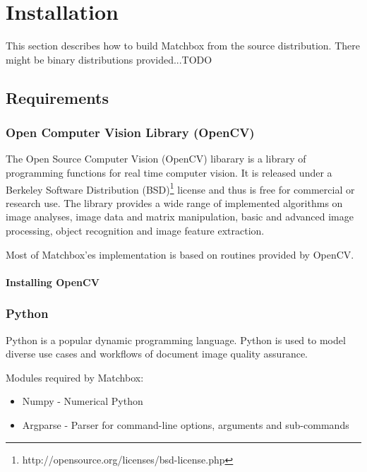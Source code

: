 \section{Installation}

This section describes how to build Matchbox from the source distribution. There might be binary distributions provided...TODO


\subsection{Requirements}

\subsubsection{Open Computer Vision Library (OpenCV)}

The Open Source Computer Vision (OpenCV) libarary \cite{opencv_library} is a library of programming functions for real time computer vision.
It is released under a Berkeley Software Distribution (BSD)\footnote{http://opensource.org/licenses/bsd-license.php} license and thus is free for commercial or research use.
The library provides a wide range of implemented algorithms on image analyses, image data and matrix manipulation, basic and advanced image processing, object recognition and image feature extraction.

Most of Matchbox'es implementation is based on routines provided by OpenCV. 

\paragraph{Installing OpenCV}


\subsubsection{Python}

Python is a popular dynamic programming language. 
Python is used to model diverse use cases and workflows of document image quality assurance.

Modules required by Matchbox:

\begin{itemize}
	\item Numpy - Numerical Python
	\item Argparse - Parser for command-line options, arguments and sub-commands
\end{itemize}


